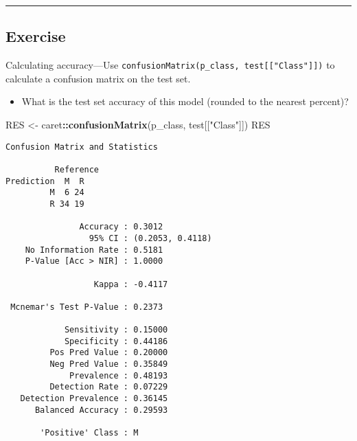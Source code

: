 \documentclass[
]{book}
\newenvironment{Shaded}{\begin{snugshade}}{\end{snugshade}}
\newcommand{\KeywordTok}[1]{\textcolor[rgb]{0.13,0.29,0.53}{\textbf{#1}}}
\newcommand{\NormalTok}[1]{#1}
\newcommand{\OperatorTok}[1]{\textcolor[rgb]{0.81,0.36,0.00}{\textbf{#1}}}
\newcommand{\StringTok}[1]{\textcolor[rgb]{0.31,0.60,0.02}{#1}}
\providecommand{\tightlist}{%
  \setlength{\itemsep}{0pt}\setlength{\parskip}{0pt}}
\begin{document}
\begin{center}\rule{0.5\linewidth}{0.5pt}\end{center}

\hypertarget{exercise-12}{%
\subsection*{Exercise}\label{exercise-12}}

Calculating accuracy---Use \texttt{confusionMatrix(p\_class,\ test{[}{[}"Class"{]}{]})} to calculate a confusion matrix on the test set.

\begin{itemize}
\tightlist
\item
  What is the test set accuracy of this model (rounded to the nearest percent)?
\end{itemize}

\begin{Shaded}
\begin{Highlighting}[]
\NormalTok{RES <-}\StringTok{ }\NormalTok{caret}\OperatorTok{::}\KeywordTok{confusionMatrix}\NormalTok{(p_class, test[[}\StringTok{"Class"}\NormalTok{]])}
\NormalTok{RES}
\end{Highlighting}
\end{Shaded}

\begin{verbatim}
Confusion Matrix and Statistics

          Reference
Prediction  M  R
         M  6 24
         R 34 19
                                          
               Accuracy : 0.3012          
                 95% CI : (0.2053, 0.4118)
    No Information Rate : 0.5181          
    P-Value [Acc > NIR] : 1.0000          
                                          
                  Kappa : -0.4117         
                                          
 Mcnemar's Test P-Value : 0.2373          
                                          
            Sensitivity : 0.15000         
            Specificity : 0.44186         
         Pos Pred Value : 0.20000         
         Neg Pred Value : 0.35849         
             Prevalence : 0.48193         
         Detection Rate : 0.07229         
   Detection Prevalence : 0.36145         
      Balanced Accuracy : 0.29593         
                                          
       'Positive' Class : M               
                                          
\end{verbatim}
\end{document}

